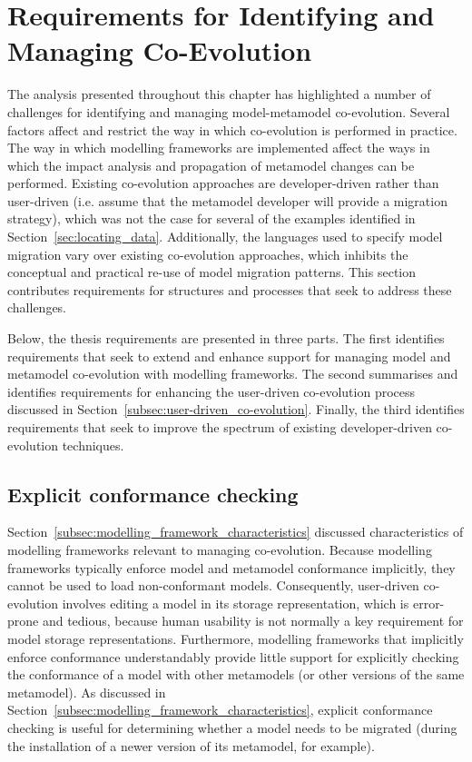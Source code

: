 \section[Requirements for Identifying and Managing Co-Evolution][Requirements for Co-Evolution]{Requirements for Identifying and Managing Co-Evolution}
\label{sec:requirements_identification}

The analysis presented throughout this chapter has highlighted a number of challenges for identifying and managing model-metamodel co-evolution. Several factors affect and restrict the way in which co-evolution is performed in practice. The way in which modelling frameworks are implemented affect the ways in which the impact analysis and propagation of metamodel changes can be performed. Existing co-evolution approaches are developer-driven rather than user-driven (i.e. assume that the metamodel developer will provide a migration strategy), which was not the case for several of the examples identified in Section~\ref{sec:locating_data}. Additionally, the languages used to specify model migration vary over existing co-evolution approaches, which inhibits the conceptual and practical re-use of model migration patterns. This section contributes requirements for structures and processes that seek to address these challenges.

Below, the thesis requirements are presented in three parts. The first identifies requirements that seek to extend and enhance support for managing model and metamodel co-evolution with modelling frameworks. The second summarises and identifies requirements for enhancing the user-driven co-evolution process discussed in Section~\ref{subsec:user-driven_co-evolution}. Finally, the third identifies requirements that seek to improve the spectrum of existing developer-driven co-evolution techniques.


\subsection{Explicit conformance checking}
Section~\ref{subsec:modelling_framework_characteristics} discussed characteristics of modelling frameworks relevant to managing co-evolution. Because modelling frameworks typically enforce model and metamodel conformance implicitly, they cannot be used to load non-conformant models. Consequently, user-driven co-evolution involves editing a model in its storage representation, which is error-prone and tedious, because human usability is not normally a key requirement for model storage representations. Furthermore, modelling frameworks that implicitly enforce conformance understandably provide little support for explicitly checking the conformance of a model with other metamodels (or other versions of the same metamodel). As discussed in Section~\ref{subsec:modelling_framework_characteristics}, explicit conformance checking is useful for determining whether a model needs to be migrated (during the installation of a newer version of its metamodel, for example).

